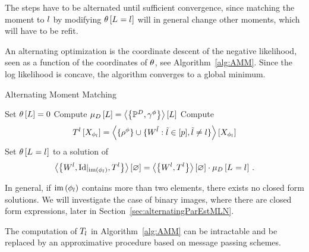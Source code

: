 The steps have to be alternated until sufficient convergence, since matching the moment to $l$ by modifying $\theta\left[L_{}=l_{}\right]$ will in general change other moments, which will have to be refit.


An alternating optimization is the coordinate descent of the negative likelihood, seen as a function of the coordinates of $\theta$, see Algorithm~\ref{alg:AMM}.
Since the log likelihood is concave, the algorithm converges to a global minimum.





\begin{algorithm}[h!]
\caption{Alternating Moment Matching}\label{alg:AMM}
\begin{algorithmic}
\State Set $\theta\left[L\right]=0$
\State Compute $\mu_{D}\left[L\right]= \left\langle \left\{\mathbb{P}^{D},\gamma^{\phi}\right\}\right\rangle \left[ L \right]$
{}
\For{$\selindexin$}
	\State Compute 
		\begin{align*}
			T^{l}\left[X_{\phi_{l}}\right] 
			= \left\langle \{\rho^{\phi}\}\cup\{W^{\tilde{l}} : \tilde{l} \in [p], \tilde{l}\neq l\}\right\rangle \left[ X_{\phi_{l}} \right] 
		\end{align*}
	\State Set $\theta\left[L_{}=l_{}\right]$ to a solution of 
	\begin{align*}
		\left\langle \left\{W^{l},{\mathrm{Id}}|_{\mathrm{im}\left(\phi_{l}\right)},T^{l}\right\}\right\rangle \left[ \varnothing \right]
		= \left\langle \left\{W^{l},T^{l}\right\}\right\rangle \left[ \varnothing \right] \cdot \mu_{D}\left[L_{}=l_{}\right] \, . 
	\end{align*}
\EndFor
\EndWhile
\end{algorithmic}
\end{algorithm}


% 
In general, if $\mathrm{im}\left(\phi_{l}\right)$ contains more than two elements, there exists no closed form solutions.
We will investigate the case of binary images, where there are closed form expressions, later in Section~\ref{sec:alternatingParEstMLN}.


%
The computation of $T_l$ in Algorithm~\ref{alg:AMM} can be intractable and be replaced by an approximative procedure based on message passing schemes.


